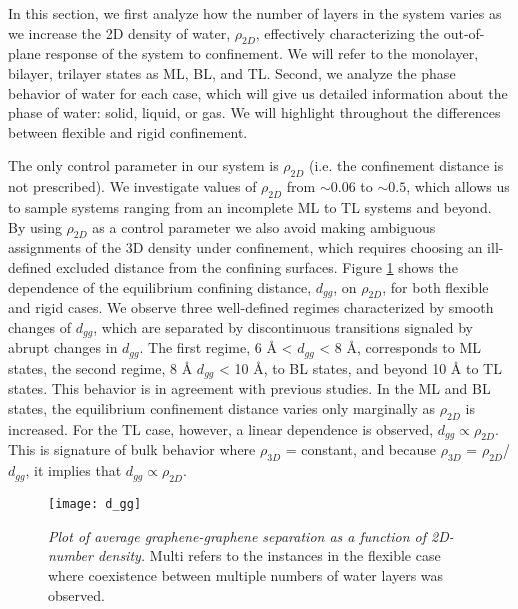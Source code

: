\documentclass[journal=acsnano,manuscript=article]{achemso}
\begin{document}
	In this section, we first analyze how the number of layers in the system varies as we increase the 2D density of water, \(\rho_{2D}\), effectively characterizing the out-of-plane response of the system to confinement. We will refer to the monolayer, bilayer, trilayer states as ML, BL, and TL. Second, we analyze the phase behavior of water for each case, which will give us detailed information about the phase of water: solid, liquid, or gas. We will highlight throughout the differences between flexible and rigid confinement. 
	
	The only control parameter in our system is \(\rho_{2D}\) (i.e. the confinement distance is not prescribed). We investigate values of \(\rho_{2D}\) from \(\sim0.06\) to \(\sim0.5\), which allows us to sample systems ranging from an incomplete ML to TL systems and beyond. By using \(\rho_{2D}\) as a control parameter we also avoid making ambiguous assignments of the 3D density under confinement, which requires choosing an ill-defined excluded distance from the confining surfaces. Figure \ref{fig:dgg_1} shows the dependence of the equilibrium confining distance, \(d_{gg}\), on \(\rho_{2D}\), for both flexible and rigid cases. We observe three well-defined regimes characterized by smooth changes of \(d_{gg}\), which are separated by discontinuous transitions signaled by abrupt changes in \(d_{gg}\). The first regime, 6 \r A < \(d_{gg}\) < 8 \r A, corresponds to ML states, the second regime, 8 \r A \(d_{gg}\) < 10 \r A, to BL states, and beyond 10 \r A to TL states. This behavior is in agreement with previous studies. In the ML and BL states, the equilibrium confinement distance varies only marginally as \(\rho_{2D}\) is increased. For the TL case, however, a linear dependence is observed, \(d_{gg} \propto \rho_{2D}\). This is signature of bulk behavior where \(\rho_{3D}\) = constant, and because \(\rho_{3D}\) = \(\rho_{2D}\)/\(d_{gg}\), it implies that \(d_{gg} \propto \rho_{2D}\). 
	
	\begin{figure}[ht!]
		\centering
		\texttt{[image: d\_gg]}
		\caption{\textit{Plot of average graphene-graphene separation as a function of 2D-number density.} Multi refers to the instances in the flexible case where coexistence between multiple numbers of water layers was observed.}
		\label{fig:dgg_1}
	\end{figure}
	
\end{document}
